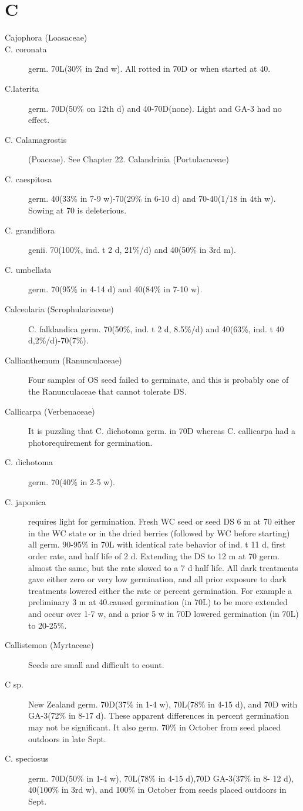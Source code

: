 \section{C}
\begin{description}

\item[Cajophora (Loasaceae)]
\item[C. coronata] germ. 70L(30\% in 2nd w). All rotted in 70D or when started at 40.
\item[C.laterita] germ. 70D(50\% on 12th d) and 40-70D(none). Light and GA-3 had
no effect.
\item[C. Calamagrostis] (Poaceae). See Chapter 22.
Calandrinia (Portulacaceae)
\item[C. caespitosa] germ. 40(33\% in 7-9 w)-70(29\% in 6-10 d) and 70-40(1/18 in 4th
w). Sowing at 70 is deleterious.
\item[C. grandiflora] genii. 70(100\%, ind. t 2 d, 21\%/d) and 40(50\% in 3rd m).
\item[C. umbellata] germ. 70(95\% in 4-14 d) and 40(84\% in 7-10 w).

\item[Calceolaria (Scrophulariaceae)] C. falklandica germ. 70(50\%, ind. t 2 d,
8.5\%/d) and 40(63\%, ind. t 40 d,2\%/d)-70(7\%).
\item[Callianthemum (Ranunculaceae)] Four samples of OS seed failed to
germinate, and this is probably one of the Ranunculaceae that cannot tolerate DS.
\item[Callicarpa (Verbenaceae)] It is puzzling that C. dichotoma germ. in 70D
whereas C. callicarpa had a photorequirement for germination.
\item[C. dichotoma] germ. 70(40\% in 2-5 w).
\item[C. japonica] requires light for germination. Fresh WC seed or seed DS 6 m at 70
either in the WC state or in the dried berries (followed by WC before starting) all germ.
90-95\% in 70L with identical rate behavior of ind. t 11 d, first order rate, and half life of
2 d. Extending the DS to 12 m at 70 germ. almost the same, but the rate slowed to a 7
d half life. All dark treatments gave either zero or very low germination, and all prior
exposure to dark treatments lowered either the rate or percent germination. For
example a preliminary 3 m at 40.caused germination (in 70L) to be more extended
and occur over 1-7 w, and a prior 5 w in 70D lowered germination (in 70L) to 20-25\%.

\item[Callistemon (Myrtaceae)] Seeds are small and difficult to count.
\item[C sp.] New Zealand germ. 70D(37\% in 1-4 w), 70L(78\% in 4-15 d), and 70D
with GA-3(72\% in 8-17 d). These apparent differences in percent germination may not
be significant. It also germ. 70\% in October from seed placed outdoors in late Sept.
\item[C. speciosus] germ. 70D(50\% in 1-4 w), 70L(78\% in 4-15 d),70D GA-3(37\% in 8-
12 d), 40(100\% in 3rd w), and 100\% in October from seeds placed outdoors in Sept.


\end{description}
